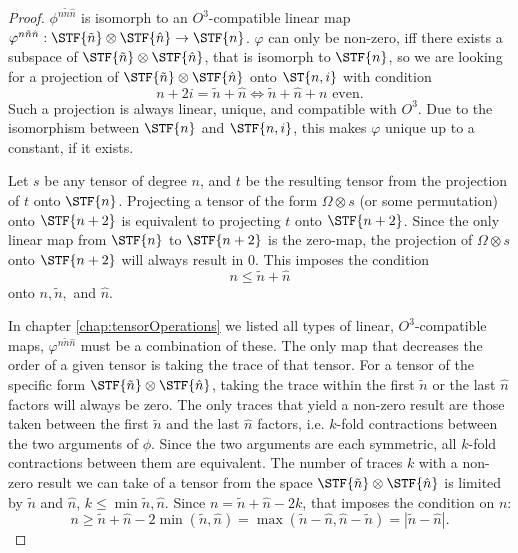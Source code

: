 \begin{proof}
	$\phi^{n\tilde{n}\hat{n}}$ is isomorph to an $O^3$-compatible linear map $\varphi^{n\tilde{n}\hat{n}}: \STF{\tilde{n}}\otimes\STF{\hat{n}}\to\STF{n}$. $\varphi$ can only be non-zero, iff there exists a subspace of $\STF{\tilde{n}}\otimes\STF{\hat{n}}$, that is isomorph to $\STF{n}$, so we are looking for a projection of $\STF{\tilde{n}}\otimes\STF{\hat{n}}$ onto $\ST{n,i}$ with condition \[n+2i=\tilde{n}+\hat{n} \iff \tilde{n}+\hat{n} + n \text{ even}.\]
	Such a projection is always linear, unique, and compatible with $O^3$. Due to the isomorphism between $\STF{n}$ and $\STF{n,i}$, this makes $\varphi$ unique up to a constant, if it exists. 
	
	Let $s$ be any tensor of degree $n$, and $t$ be the resulting tensor from the projection of $t$ onto $\STF{n}$. Projecting a tensor of the form $\Omega \otimes s$ (or some permutation) onto $\STF{n+2}$ is equivalent to projecting $t$ onto $\STF{n+2}$. Since the only linear map from $\STF{n}$ to $\STF{n+2}$ is the zero-map, the projection of $\Omega \otimes s$ onto $\STF{n+2}$ will always result in $0$. This imposes the condition
	\[n\leq \tilde{n}+\hat{n}\]
	onto $n, \tilde{n},$ and $\hat{n}$.
	
	In chapter \ref{chap:tensorOperations} we listed all types of linear, $O^3$-compatible maps, $\varphi^{n\tilde{n}\hat{n}}$ must be a combination of these. The only map that decreases the order of a given tensor is taking the trace of that tensor. For a tensor of the specific form $\STF{\tilde{n}}\otimes\STF{\hat{n}}$, taking the trace within the first $\tilde{n}$ or the last $\hat{n}$ factors will always be zero. The only traces that yield a non-zero result are those taken between the first $\tilde{n}$ and the last $\hat{n}$ factors, i.e. $k$-fold contractions between the two arguments of $\phi$. Since the two arguments are each symmetric, all $k$-fold contractions between them are equivalent. The number of traces $k$ with a non-zero result we can take of a tensor from the space $\STF{\tilde{n}}\otimes\STF{\hat{n}}$ is limited by $\tilde{n}$ and $\hat{n}$, $k\leq \min{\tilde{n},\hat{n}}$. Since $n=\tilde{n}+\hat{n}-2k$, that imposes the condition on $n$:
	\[n \geq \tilde{n}+\hat{n}-2\min(\tilde{n},\hat{n}) = \max(\tilde{n}-\hat{n},\hat{n}-\tilde{n}) = |\tilde{n}-\hat{n}|.\]
	
\end{proof}
